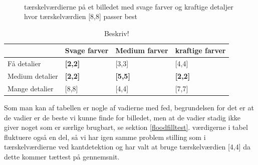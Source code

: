 \begin{figure}[!h]
    \centering
    \\
    \caption[]{tærskelværdierne på et billedet med svage farver og kraftige detaljer hvor tærskelværdien [8,8] passer best}
    \label{Floodfillbilledet}
\end{figure}

\begin{table}[!h]
    \centering
    \begin{tabular}{| l | l | l | l |} \hline
        & Svage farver 		& Medium farver & kraftige farver \\ \hline
        Få detalier 		& \textbf{[2,2]}	& [3,3]			& [4,4]\\ \hline
        Medium detalier 	& \textbf{[2,2]}	& \textbf{[5,5]}& \textbf{[2,2]}\\ \hline
        Mange detalier		& [8,8]				& [4,4]			& [7,7]\\ \hline
    \end{tabular}
    \caption{Beskriv!}
    \label{thressholdsTabelFF}
\end{table}

Som man kan af tabellen er nogle af vadierne med fed, begrundelsen for det er
at de vadier er de beste vi kunne finde for billedet, men at de vadier stadig
ikke giver noget som er særlige brugbart, se sektion \ref{floodfilltest}.
værdigerne i tabel fluktuere også en del, så vi har igen samme problem stilling
som i tærskelværdierne ved kantdetektion og har valt at bruge tærskelværdien
[4,4] da dette kommer tættest på gennemsnit.
